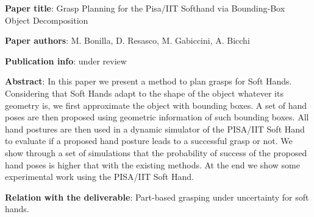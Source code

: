 

\item
\begin{list}{\quad}{}
\item \textbf{Paper title}: Grasp Planning for the Pisa/IIT Softhand via Bounding-Box Object Decomposition
\item \textbf{Paper authors}: M. Bonilla, D. Resasco, M. Gabiccini, A. Bicchi
\item\textbf{Publication info}: under review
\item\textbf{Abstract}:
  In this paper we present a method to plan grasps for Soft Hands. Considering that Soft Hands adapt to the shape of the object whatever its geometry is, we first approximate the object with bounding boxes. A set of hand poses are then proposed using geometric information of such bounding boxes. All hand postures are then used in a dynamic simulator of the PISA/IIT Soft Hand to evaluate if a proposed hand posture leads to a successful grasp or not.
We show through a set of simulations that the probability of success of the proposed hand poses is higher that with the existing methods.
At the end we show some experimental work using the PISA/IIT Soft Hand.

\item \textbf{Relation with the deliverable}: Part-based grasping under uncertainty for soft hands.
\end{list}